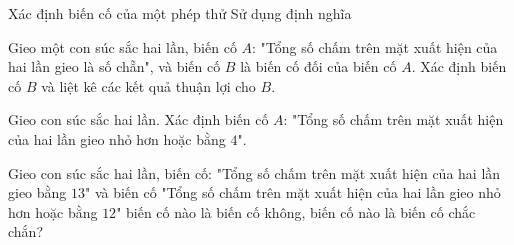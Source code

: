 \begin{dang}{Xác định biến cố của một phép thử}
	Sử dụng định nghĩa
\end{dang}
\begin{vd}\label{vd2ss}%
	Gieo một con súc sắc hai lần, biến cố $A$: "Tổng số chấm trên mặt xuất hiện của hai lần gieo là số chẵn", và biến cố $B$ là biến cố đối của biến cố $A$. Xác định biến cố $B$ và liệt kê các kết quả thuận lợi cho $B$.
\end{vd}
\begin{vd}%
	Gieo con súc sắc hai lần. Xác định biến cố $A$: "Tổng số chấm trên mặt xuất hiện của hai lần gieo nhỏ hơn hoặc bằng $4$".
\end{vd}
\begin{vd}%
	Gieo con súc sắc hai lần, biến cố: "Tổng số chấm trên mặt xuất hiện của hai lần gieo bằng $13$" và biến cố "Tổng số chấm trên mặt xuất hiện của hai lần gieo nhỏ hơn hoặc bằng $12$" biến cố nào là biến cố không, biến cố nào là biến cố chắc chắn?
\end{vd}


